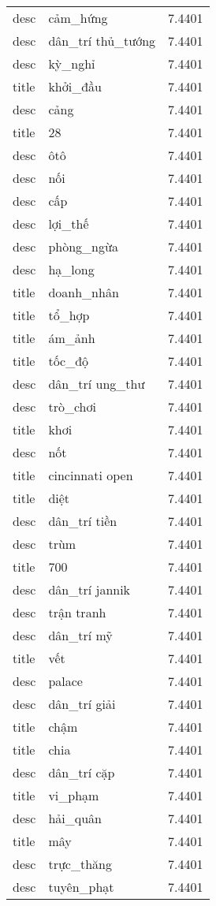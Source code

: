 \documentclass{article}
\begin{document}
\begin{tabular}{lll}
desc & cảm\_hứng & 7.4401\\
desc & dân\_trí thủ\_tướng & 7.4401\\
desc & kỳ\_nghỉ & 7.4401\\
title & khởi\_đầu & 7.4401\\
desc & cảng & 7.4401\\
title & 28 & 7.4401\\
desc & ôtô & 7.4401\\
desc & nối & 7.4401\\
desc & cấp & 7.4401\\
desc & lợi\_thế & 7.4401\\
desc & phòng\_ngừa & 7.4401\\
desc & hạ\_long & 7.4401\\
title & doanh\_nhân & 7.4401\\
title & tổ\_hợp & 7.4401\\
title & ám\_ảnh & 7.4401\\
title & tốc\_độ & 7.4401\\
desc & dân\_trí ung\_thư & 7.4401\\
desc & trò\_chơi & 7.4401\\
title & khơi & 7.4401\\
desc & nốt & 7.4401\\
title & cincinnati open & 7.4401\\
title & diệt & 7.4401\\
desc & dân\_trí tiền & 7.4401\\
desc & trùm & 7.4401\\
title & 700 & 7.4401\\
desc & dân\_trí jannik & 7.4401\\
desc & trận tranh & 7.4401\\
desc & dân\_trí mỹ & 7.4401\\
title & vết & 7.4401\\
desc & palace & 7.4401\\
desc & dân\_trí giải & 7.4401\\
title & chậm & 7.4401\\
title & chia & 7.4401\\
desc & dân\_trí cặp & 7.4401\\
title & vi\_phạm & 7.4401\\
desc & hải\_quân & 7.4401\\
title & mây & 7.4401\\
desc & trực\_thăng & 7.4401\\
desc & tuyên\_phạt & 7.4401\\

\end{tabular}
\end{document}
